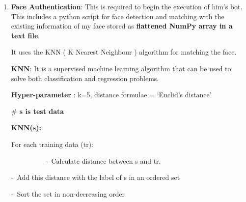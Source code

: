 \documentclass[12pt]{report}
\renewcommand{\_}{\kern-1.5pt\textunderscore\kern-1.5pt}
\begin{document}
\begin{enumerate}
	\item \textbf{Face Authentication}: This is required to begin the execution of him’s bot. This includes a python script for face detection and matching with the existing information of my face stored as \textbf{flattened NumPy array in a text file}.\par

\begin{FlushLeft}
It uses the KNN ( K Nearest Neighbour ) algorithm for matching the face.
\end{FlushLeft}\par

\begin{FlushLeft}
\textbf{KNN}: It is a supervised machine learning algorithm that can be used to solve both classification and regression problems.
\end{FlushLeft}\par

\begin{FlushLeft}
\textbf{Hyper-parameter} : k=5, distance formulae = ‘Euclid’s distance’
\end{FlushLeft}\par

\begin{FlushLeft}
\textbf{$\#$  s is test data}
\end{FlushLeft}\par

\begin{FlushLeft}
\textbf{KNN(s):}
\end{FlushLeft}\par

\begin{FlushLeft}
\tab For each training data (tr):
\end{FlushLeft}\par

\begin{FlushLeft}
\ \ \ \ \ \ \ \ \ \  \tab -\  Calculate distance between s and tr.
\end{FlushLeft}\par

\begin{FlushLeft}
\tab \tab -\  Add this distance with the label of s in an ordered set
\end{FlushLeft}\par

\begin{FlushLeft}
\tab \tab -\  Sort the set in non-decreasing order
\end{FlushLeft}\par


\end{enumerate}
\end{document}
